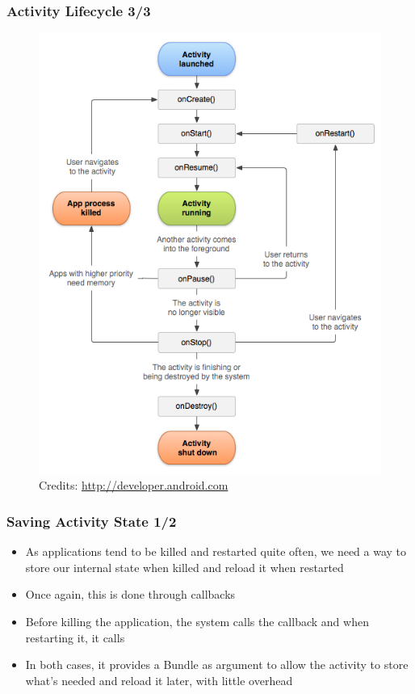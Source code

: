 \begin{frame}
  \frametitle{Activity Lifecycle 3/3}
  \begin{figure}[h!]
    \centering
    \includegraphics[height=0.8\textheight]{slides/android-application-activities/activity-lifecycle.png}\\
    {
      \tiny
      Credits: \url{http://developer.android.com}
    }
  \end{figure}
\end{frame}

\begin{frame}
  \frametitle{Saving Activity State 1/2}
  \begin{itemize}
  \item As applications tend to be killed and restarted quite often,
    we need a way to store our internal state when killed and reload
    it when restarted
  \item Once again, this is done through callbacks
  \item Before killing the application, the system calls the
     callback and when restarting it, it
    calls 
  \item In both cases, it provides a Bundle as argument to allow the
    activity to store what's needed and reload it later, with little
    overhead
  \end{itemize}
\end{frame}


